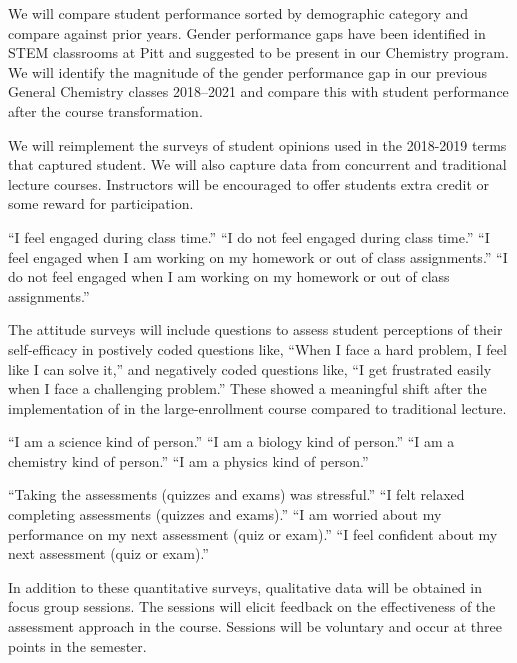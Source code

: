 \documentclass[10pt,letterpaper]{article}
\begin{document}
 We will compare student performance sorted by demographic category and compare against prior years. Gender performance gaps have been identified in STEM classrooms at Pitt and suggested to be present in our Chemistry program. We will identify the magnitude of the gender performance gap in our previous General Chemistry classes 2018--2021 and compare this with student performance after the course transformation.

We will reimplement the surveys of student opinions used in the 2018-2019 terms that captured student.
We will also capture data from concurrent \pogil and traditional lecture courses. Instructors will be encouraged to offer students extra credit or some reward for participation.

``I feel engaged during class time.'' ``I do not feel engaged during class time.'' ``I feel engaged when I am working on my homework or out of class assignments.'' ``I do not feel engaged when I am working on my homework or out of class assignments.''


The attitude surveys will include questions to assess student perceptions of their self-efficacy in postively coded questions like, ``When I face a hard problem, I feel like I can solve it,'' and negatively coded questions like, ``I get frustrated easily when I face a challenging problem.'' These showed a meaningful shift after the implementation of \pogil  in the large-enrollment course compared to traditional lecture.

``I am a science kind of person.'' ``I am a biology kind of person.'' ``I am a chemistry kind of person.'' ``I am a physics kind of person.'' 

``Taking the assessments (quizzes and exams) was stressful.'' ``I felt relaxed completing assessments (quizzes and exams).'' ``I am worried about my performance on my next assessment (quiz or exam).'' ``I feel confident about my next assessment (quiz or exam).''

 In addition to these quantitative surveys, qualitative data will be obtained in focus group sessions. The sessions will elicit feedback on the effectiveness of the assessment approach in the course. Sessions will be voluntary and occur at three points in the semester.
\end{document}
